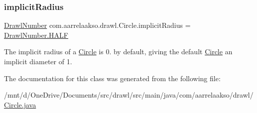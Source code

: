 \subsubsection{\texorpdfstring{implicit\+Radius}{implicitRadius}}
{\footnotesize\ttfamily \hyperlink{classcom_1_1aarrelaakso_1_1drawl_1_1_drawl_number}{Drawl\+Number} com.\+aarrelaakso.\+drawl.\+Circle.\+implicit\+Radius = \hyperlink{classcom_1_1aarrelaakso_1_1drawl_1_1_drawl_number_ae0980b8dd35b0bb52b87b37700d15322}{Drawl\+Number.\+H\+A\+LF}\hspace{0.3cm}{\ttfamily [private]}}



The implicit radius of a \hyperlink{classcom_1_1aarrelaakso_1_1drawl_1_1_circle}{Circle} is 0. by default, giving the default \hyperlink{classcom_1_1aarrelaakso_1_1drawl_1_1_circle}{Circle} an implicit diameter of 1. 



The documentation for this class was generated from the following file\+:\begin{DoxyCompactItemize}
\item 
/mnt/d/\+One\+Drive/\+Documents/src/drawl/src/main/java/com/aarrelaakso/drawl/\hyperlink{_circle_8java}{Circle.\+java}\end{DoxyCompactItemize}
